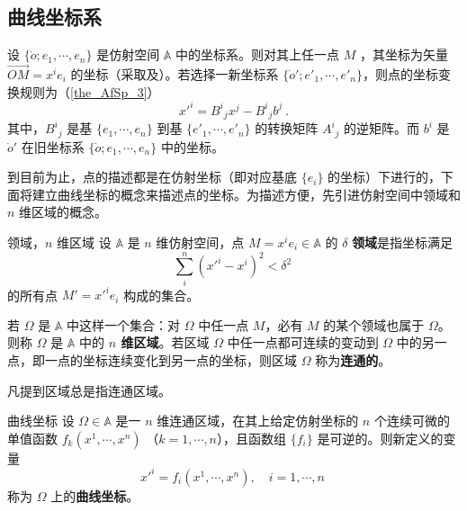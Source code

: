 

\subsection{曲线坐标系}
设 $\{\dot o;e_1,\cdots,e_n\}$ 是仿射空间 $\mathbb A$ 中的坐标系。则对其上任一点 $M$ ，其坐标为矢量 $\overrightarrow{OM}=x^i e_i$ 的坐标（采取及）。若选择一新坐标系 $\{\dot o';e'_1,\cdots,e'_n\}$，则点的坐标变换规则为（\autoref{the_AfSp_3}）
\begin{equation}
x'^i={B^i}_jx^j-{B^i}_j b^j~.
\end{equation}
其中，${B^i}_j$ 是基 $\{e_1,\cdots,e_n\}$ 到基 $\{e'_1,\cdots,e'_n\}$ 的转换矩阵 ${A^i}_j$ 的逆矩阵。而 $b^i$ 是 $\dot o'$ 在旧坐标系 $\{\dot o;e_1,\cdots,e_n\}$ 中的坐标。

到目前为止，点的描述都是在仿射坐标（即对应基底 $\{e_i\}$ 的坐标）下进行的，下面将建立曲线坐标的概念来描述点的坐标。为描述方便，先引进仿射空间中领域和 $n$ 维区域的概念。
\begin{definition}{领域，$n$ 维区域}
设 $\mathbb A$ 是 $n$ 维仿射空间，点 $M=x^ie_i\in\mathbb A$ 的 $\delta$ \textbf{领域}是指坐标满足
\begin{equation}
\sum_{i}^n(x'^i-x^i)^2<\delta^2~
\end{equation}
的所有点 $M'=x'^i e_i$ 构成的集合。

若 $\Omega$ 是 $\mathbb A$ 中这样一个集合：对 $\Omega$ 中任一点 $M$，必有 $M$ 的某个领域也属于 $\Omega$。则称 $\Omega$ 是 $\mathbb A$ 中的\textbf{ $n$ 维区域}。若区域 $\Omega$ 中任一点都可连续的变动到 $\Omega$ 中的另一点，即一点的坐标连续变化到另一点的坐标，则区域 $\Omega$ 称为\textbf{连通的}。
\end{definition}

凡提到区域总是指连通区域。

\begin{definition}{曲线坐标}
设 $\Omega\in\mathbb A$ 是一 $n$ 维连通区域，在其上给定仿射坐标的 $n$ 个连续可微的单值函数 $f_k(x^1,\cdots,x^n)$ （$k=1,\cdots,n$），且函数组 $\{f_i\}$ 是可逆的。则新定义的变量
\begin{equation}
x'^i=f_i(x^1,\cdots,x^n),\quad i=1,\cdots,n~
\end{equation}
称为 $\Omega$ 上的\textbf{曲线坐标}。
\end{definition}

